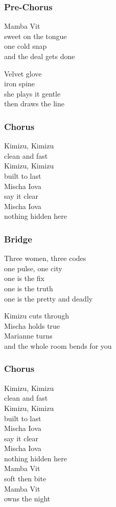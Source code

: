 \subsubsection{Pre-Chorus}\label{pre-chorus-5}

Mamba Vit\\
sweet on the tongue\\
one cold snap\\
and the deal gets done

Velvet glove\\
iron spine\\
she plays it gentle\\
then draws the line

\subsubsection{Chorus}\label{chorus-13}

Kimizu, Kimizu\\
clean and fast\\
Kimizu, Kimizu\\
built to last\\
Mischa Iova\\
say it clear\\
Mischa Iova\\
nothing hidden here

\subsubsection{Bridge}\label{bridge-3}

Three women, three codes\\
one pulse, one city\\
one is the fix\\
one is the truth\\
one is the pretty and deadly

Kimizu cuts through\\
Mischa holds true\\
Marianne turns\\
and the whole room bends for you

\subsubsection{Chorus}\label{chorus-14}

Kimizu, Kimizu\\
clean and fast\\
Kimizu, Kimizu\\
built to last\\
Mischa Iova\\
say it clear\\
Mischa Iova\\
nothing hidden here\\
Mamba Vit\\
soft then bite\\
Mamba Vit\\
owns the night

